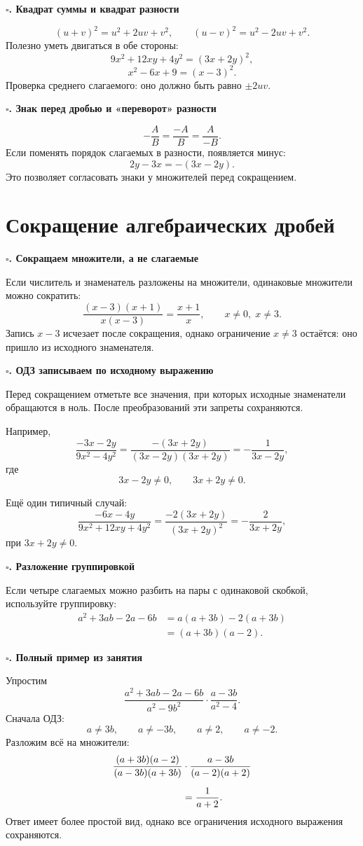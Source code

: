 \documentclass[a4paper,12pt]{article}
\newcommand{\topic}[1]{%
  \vspace{0.45em}
  {\large\bfseries\color{darkaccent}$\square$\;#1}\par
  \vspace{0.25em}
}
\begin{document}
\topic{3. Квадрат суммы и квадрат разности}
\[
(u+v)^2=u^2+2uv+v^2,
\qquad
(u-v)^2=u^2-2uv+v^2.
\]
Полезно уметь двигаться в обе стороны:
\[
9x^2+12xy+4y^2=(3x+2y)^2,
\]
\[
x^2-6x+9=(x-3)^2.
\]
Проверка среднего слагаемого: оно должно быть равно $\pm 2uv$.

\topic{4. Знак перед дробью и «переворот» разности}
\[
-\frac{A}{B}=\frac{-A}{B}=\frac{A}{-B}.
\]
Если поменять порядок слагаемых в разности, появляется минус:
\[
2y-3x=-(3x-2y).
\]
Это позволяет согласовать знаки у множителей перед сокращением.

\clearpage
\section*{Сокращение алгебраических дробей}

\topic{5. Сокращаем множители, а не слагаемые}
Если числитель и знаменатель разложены на множители, одинаковые множители можно сократить:
\[
\frac{(x-3)(x+1)}{x(x-3)}=\frac{x+1}{x},
\qquad x\ne0,\;x\ne3.
\]
Запись $x-3$ исчезает после сокращения, однако ограничение $x\ne3$ остаётся: оно пришло из исходного знаменателя.

\topic{6. ОДЗ записываем по исходному выражению}
Перед сокращением отметьте все значения, при которых исходные знаменатели обращаются в ноль. После преобразований эти запреты сохраняются.

Например,
\[
\frac{-3x-2y}{9x^2-4y^2}
=\frac{-(3x+2y)}{(3x-2y)(3x+2y)}
=-\frac{1}{3x-2y},
\]
где
\[
3x-2y\ne0,\qquad 3x+2y\ne0.
\]

Ещё один типичный случай:
\[
\frac{-6x-4y}{9x^2+12xy+4y^2}
=\frac{-2(3x+2y)}{(3x+2y)^2}
=-\frac{2}{3x+2y},
\]
при $3x+2y\ne0$.

\topic{7. Разложение группировкой}
Если четыре слагаемых можно разбить на пары с одинаковой скобкой, используйте группировку:
\begin{align*}
 a^2+3ab-2a-6b
 &=a(a+3b)-2(a+3b)\\
 &=(a+3b)(a-2).
\end{align*}

\clearpage
\topic{8. Полный пример из занятия}
Упростим
\[
\frac{a^2+3ab-2a-6b}{a^2-9b^2}\cdot
\frac{a-3b}{a^2-4}.
\]
Сначала ОДЗ:
\[
a\ne3b,\qquad a\ne-3b,\qquad a\ne2,\qquad a\ne-2.
\]
Разложим всё на множители:
\begin{align*}
&\frac{(a+3b)(a-2)}{(a-3b)(a+3b)}\cdot
\frac{a-3b}{(a-2)(a+2)}\\[2mm]
&\hspace{25mm}=\frac{1}{a+2}.
\end{align*}
Ответ имеет более простой вид, однако все ограничения исходного выражения сохраняются.
\end{document}
